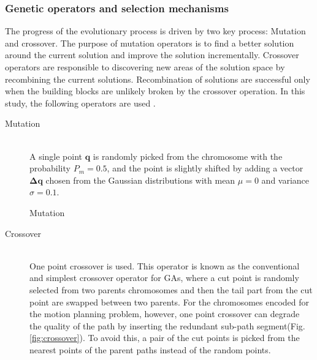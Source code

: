\documentclass[12pt]{article} %
\begin{document}
\subsubsection{Genetic operators and selection mechanisms}
The progress of the evolutionary process is driven by two key process: Mutation and crossover. The purpose of mutation operators is to find a better solution around the current solution and improve the solution incrementally. Crossover operators are responsible to discovering new areas of the solution space by recombining the current solutions. Recombination of solutions are successful only when the building blocks are unlikely broken by the crossover operation. In this study, the following operators are used .

\begin{description} %
\item[Mutation] \hfill \\
A single point $\bm{q}$ is randomly picked from the chromosome with the probability $P_m = 0.5$, and the point is slightly shifted by adding a vector $\bm{\Delta q}$ chosen from the Gaussian distributions with mean $\mu = 0$ and variance $\sigma = 0.1$.
\end{description} 
\begin{figure}[H] %
\caption{Mutation}	
\label{fig:mutation}
\end{figure}

\begin{description}
\item[Crossover] \hfill \\
One point crossover is used. This operator is known as the conventional and simplest crossover operator for GAs, where a cut point is randomly selected from two parents chromosomes and then the tail part from the cut point are swapped between two parents. For the chromosomes encoded for the motion planning problem, however, one point crossover can degrade the quality of the path by inserting the redundant sub-path segment(Fig.\ref{fig:crossover}). To avoid this, a pair of the cut points is picked from the nearest points of the parent paths instead of the random points.
\end{description} 
\end{document}
